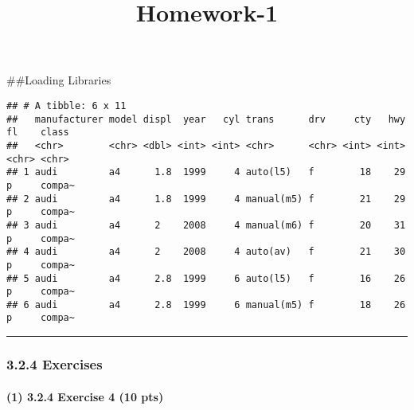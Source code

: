 \documentclass[
]{article}
\title{Homework-1}
\author{}
\date{\vspace{-2.5em}}
\newenvironment{Shaded}{\begin{snugshade}}{\end{snugshade}}
\newcommand{\AttributeTok}[1]{\textcolor[rgb]{0.77,0.63,0.00}{#1}}
\newcommand{\CommentTok}[1]{\textcolor[rgb]{0.56,0.35,0.01}{\textit{#1}}}
\newcommand{\ConstantTok}[1]{\textcolor[rgb]{0.00,0.00,0.00}{#1}}
\newcommand{\DecValTok}[1]{\textcolor[rgb]{0.00,0.00,0.81}{#1}}
\newcommand{\FloatTok}[1]{\textcolor[rgb]{0.00,0.00,0.81}{#1}}
\newcommand{\FunctionTok}[1]{\textcolor[rgb]{0.00,0.00,0.00}{#1}}
\newcommand{\NormalTok}[1]{#1}
\newcommand{\SpecialCharTok}[1]{\textcolor[rgb]{0.00,0.00,0.00}{#1}}
\begin{document}
\maketitle

\#\#Loading Libraries

\begin{Shaded}
\end{Shaded}

\begin{verbatim}
## # A tibble: 6 x 11
##   manufacturer model displ  year   cyl trans      drv     cty   hwy fl    class 
##   <chr>        <chr> <dbl> <int> <int> <chr>      <chr> <int> <int> <chr> <chr> 
## 1 audi         a4      1.8  1999     4 auto(l5)   f        18    29 p     compa~
## 2 audi         a4      1.8  1999     4 manual(m5) f        21    29 p     compa~
## 3 audi         a4      2    2008     4 manual(m6) f        20    31 p     compa~
## 4 audi         a4      2    2008     4 auto(av)   f        21    30 p     compa~
## 5 audi         a4      2.8  1999     6 auto(l5)   f        16    26 p     compa~
## 6 audi         a4      2.8  1999     6 manual(m5) f        18    26 p     compa~
\end{verbatim}

\begin{center}\rule{0.5\linewidth}{0.5pt}\end{center}

\hypertarget{exercises}{%
\subsubsection{3.2.4 Exercises}\label{exercises}}

\hypertarget{exercise-4-10-pts}{%
\paragraph{(1) 3.2.4 Exercise 4 (10 pts)}\label{exercise-4-10-pts}}
\end{document}
